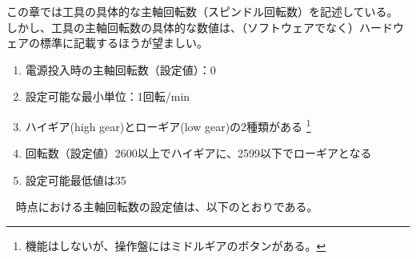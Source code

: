 

\begin{marker}
この章では工具の具体的な主軸回転数（スピンドル回転数）を記述している。
しかし、工具の主軸回転数の具体的な数値は、（ソフトウェアでなく）ハードウェアの標準に記載するほうが望ましい。
\end{marker}



\begin{enumerate}[label=\sarrow]
\item {}電源投入時の主軸回転数（設定値）：0
\item 設定可能な最小単位：1回転/min
\item {}ハイギア(high gear)とローギア(low gear)の2種類がある%
\footnote{機能はしないが、操作盤にはミドルギアのボタンがある。}

\item 回転数（設定値）2600以上でハイギアに、2599以下でローギアとなる
\item 設定可能最低値は35
\end{enumerate}
~\newline\noindent
\dateKouguRotation 時点における主軸回転数の設定値は、以下のとおりである。\\


